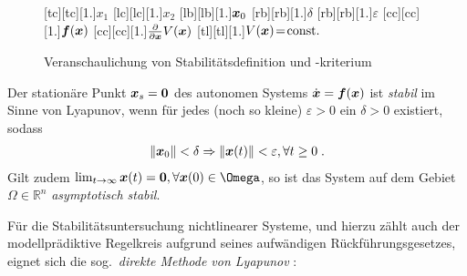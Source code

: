 \begin{figure}[ht]
\centering
    [tc][tc][1.]{$x_1$}
		[lc][lc][1.]{$x_2$}
		[lb][lb][1.]{$\boldsymbol{x}_0$}
		[rb][rb][1.]{$\delta$}
		[rb][rb][1.]{$\varepsilon$}
		\hspace{.5cm}
		[cc][cc][1.]{$\boldsymbol{f}(\boldsymbol{x})$}
		[cc][cc][1.]{$\frac{\partial}{\partial \boldsymbol{x}} V(\boldsymbol{x})$}
		[tl][tl][1.]{$V(\boldsymbol{x})\!=\!\text{const.}$}
	\caption[Veranschaulichung von Stabilitätsdefinition und -kriterium]{Veranschaulichung von Stabilitätsdefinition und -kriterium \cite{khalil2002nonlinear}}
	\label{fig:3_delta_epsilon}
\end{figure}

\begin{mydef}
Der stationäre Punkt $\boldsymbol{x}_s = \boldsymbol{0}$ des autonomen Systems
	$ \dot {\boldsymbol{x}} = \boldsymbol{f}(\boldsymbol{x}) $
ist \emph{stabil} im Sinne von Lyapunov, wenn für jedes (noch so kleine) $\varepsilon > 0$ ein $\delta > 0$ %
existiert, sodass %
\begin{align*}
	\|\boldsymbol{x}_0 \| < \delta \Rightarrow \| \boldsymbol{x}(t)\| < \varepsilon, \forall t \geq 0 \;.
\end{align*}
Gilt zudem $\lim_{t\rightarrow \infty} \bs x(t)= \bs 0, \forall \bs x(0)\in \Omega$, so ist das System auf dem Gebiet $\Omega\in\mathbb R^n$ \emph{asymptotisch stabil}.
\end{mydef}

Für die Stabilitätsuntersuchung nichtlinearer Systeme, und hierzu zählt auch der modellprädiktive Regelkreis aufgrund seines aufwändigen Rückführungsgesetzes, eignet sich die sog.\ \emph{direkte Methode von Lyapunov} \cite{khalil2002nonlinear}:

